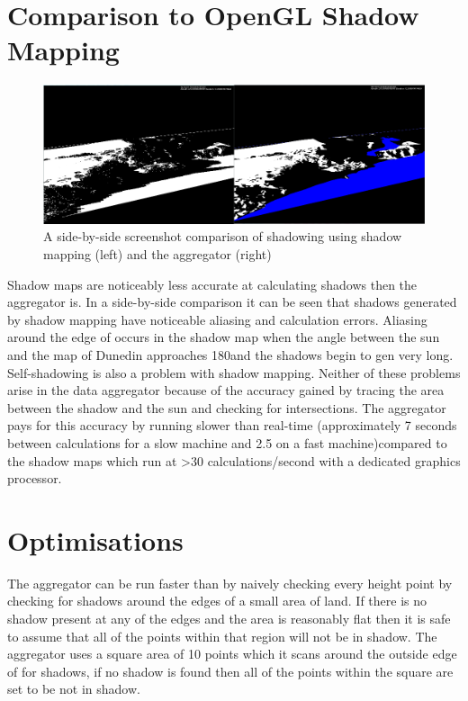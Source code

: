 \documentclass[12pt]{report}
\begin{document}
\section{Comparison to OpenGL Shadow Mapping}
\begin{figure}[h]
\centering
\includegraphics[scale=0.4]{aggregatorvsshadowmapping.png}
\caption{A side-by-side screenshot comparison of shadowing using shadow mapping (left) and the aggregator (right)}
\end{figure}

Shadow maps are noticeably less accurate at calculating shadows then the aggregator is. In a side-by-side comparison it can be seen that shadows generated by shadow mapping have noticeable aliasing and calculation errors. Aliasing  around the edge of occurs in the shadow map when the angle between the sun and the map of Dunedin approaches 180\degree and the shadows begin to gen very long. Self-shadowing is also a problem with shadow mapping. Neither of these problems arise in the data aggregator because of the accuracy gained by tracing the area between the shadow and the sun and checking for intersections. The aggregator pays for this accuracy by running slower than real-time (approximately 7 seconds between calculations for a slow machine and 2.5 on a fast machine)compared to the shadow maps which run at >30 calculations/second with a dedicated graphics processor.

\section{Optimisations}
The aggregator can be run faster than by naively checking every height point by checking for shadows around the edges of a small area of land. If there is no shadow present at any of the edges and the area is reasonably flat then it is safe to assume that all of the points within that region will not be in shadow. The aggregator uses a square area of 10 points which it scans around the outside edge of for shadows, if no shadow is found then all of the points within the square are set to be not in shadow.
\end{document}
